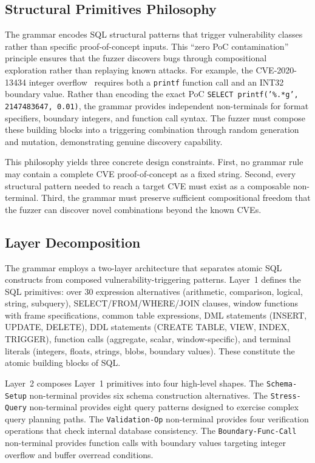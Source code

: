 \subsection{Structural Primitives Philosophy}

The grammar encodes SQL structural patterns that trigger vulnerability classes rather than specific proof-of-concept inputs. This ``zero PoC contamination'' principle ensures that the fuzzer discovers bugs through compositional exploration rather than replaying known attacks. For example, the CVE-2020-13434 integer overflow~\cite{cve202013434} requires both a \texttt{printf} function call and an INT32 boundary value. Rather than encoding the exact PoC \texttt{SELECT printf('\%.*g', 2147483647, 0.01)}, the grammar provides independent non-terminals for format specifiers, boundary integers, and function call syntax. The fuzzer must compose these building blocks into a triggering combination through random generation and mutation, demonstrating genuine discovery capability.

This philosophy yields three concrete design constraints. First, no grammar rule may contain a complete CVE proof-of-concept as a fixed string. Second, every structural pattern needed to reach a target CVE must exist as a composable non-terminal. Third, the grammar must preserve sufficient compositional freedom that the fuzzer can discover novel combinations beyond the known CVEs.

\subsection{Layer Decomposition}

The grammar employs a two-layer architecture that separates atomic SQL constructs from composed vulnerability-triggering patterns. Layer~1 defines the SQL primitives: over 30 expression alternatives (arithmetic, comparison, logical, string, subquery), SELECT/FROM/WHERE/JOIN clauses, window functions with frame specifications, common table expressions, DML statements (INSERT, UPDATE, DELETE), DDL statements (CREATE TABLE, VIEW, INDEX, TRIGGER), function calls (aggregate, scalar, window-specific), and terminal literals (integers, floats, strings, blobs, boundary values). These constitute the atomic building blocks of SQL.

Layer~2 composes Layer~1 primitives into four high-level shapes. The \texttt{Schema-Setup} non-terminal provides six schema construction alternatives. The \texttt{Stress-Query} non-terminal provides eight query patterns designed to exercise complex query planning paths. The \texttt{Validation-Op} non-terminal provides four verification operations that check internal database consistency. The \texttt{Boundary-Func-Call} non-terminal provides function calls with boundary values targeting integer overflow and buffer overread conditions.

